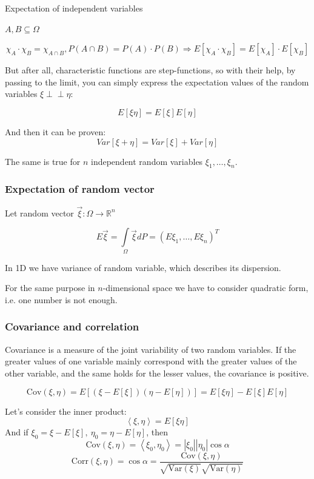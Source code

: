 \documentclass[fullscreen=true, bookmarks=true, hyperref={pdfencoding=unicode}]{beamer}
\newcommand{\indep}{\perp \!\!\! \perp}
\begin{document}
\begin{frame}{Expectation of independent variables}

  $A, B \subseteq \Omega$
  
  $$\chi_A\cdot\chi_B = \chi_{A\cap B}, P(A\cap B) = P(A)\cdot P(B) \Rightarrow 
   E[\chi_A\cdot\chi_B] = E[\chi_{A}] \cdot E[\chi_{B}]
  $$

  But after all, characteristic functions are step-functions, 
  so with their help, by passing to the limit, 
  you can simply express the expectation values of the random variables $\xi \indep \eta$:

  $$ \boxed{E[\xi\eta] = E[\xi]E[\eta]} $$

  And then it can be proven:
  $$ {Var[\xi + \eta] = Var[\xi] + Var[\eta]} $$

  The same is true for $n$ independent random variables $\xi_1, \dots, \xi_n$.
\end{frame}


\begin{frame}
  \frametitle{Expectation of random vector}
  Let random vector $\vec{\xi}:\Omega \to \mathbb{R}^n$

  \begin{definition}
    $$E\vec{\xi} = \int\limits_{\Omega} \vec{\xi} dP = (E\xi_1, \dots, E\xi_n)^T$$
  \end{definition}

  In 1D we have variance of random variable, which describes its dispersion.

  For the same purpose in $n$-dimensional space we have to consider quadratic form, 
  i.e. one number is not enough.

\end{frame}

\begin{frame}
  \frametitle{Covariance and correlation}
  
  {\small Covariance is a measure of the joint variability of 
  two random variables. If the greater values of one variable mainly 
  correspond with the greater values of the other variable, 
  and the same holds for the lesser values, the covariance is positive.}
  
  \[\text{Cov}(\xi, \eta) = E[(\xi - E[\xi])(\eta - E[\eta])] = E[\xi\eta] - E[\xi]E[\eta]\]
  
  Let's consider the inner product:
  $$\left< \xi, \eta \right> = E[\xi\eta]$$
  And if $\xi_0 = \xi - E[\xi],\ \eta_0 = \eta - E[\eta]$, then
  $$\text{Cov}(\xi, \eta) = \left<\xi_0, \eta_0 \right> = |\xi_0||\eta_0|\cos \alpha$$
  $$\text{Corr}(\xi, \eta) = \cos \alpha = 
  \frac{\text{Cov}(\xi, \eta)}{\sqrt{\text{Var}(\xi)}\sqrt{\text{Var}(\eta)}}$$
\end{frame}
\end{document}
